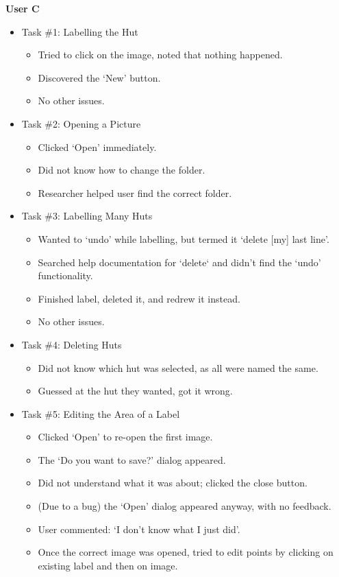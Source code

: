 \documentclass[11pt,twocolumn]{article}
\begin{document}
\textbf{User C}
\begin{itemize}
\item Task \#1: Labelling the Hut
\begin{itemize}
\item Tried to click on the image, noted that nothing happened.
\item Discovered the `New' button.
\item No other issues.
\end{itemize}
\item Task \#2: Opening a Picture
\begin{itemize}
\item Clicked `Open' immediately. 
\item Did not know how to change the folder.
\item Researcher helped user find the correct folder.
\end{itemize}
\item Task \#3: Labelling Many Huts
\begin{itemize}
\item Wanted to `undo' while labelling, but termed it `delete [my] last line'.
\item Searched help documentation for `delete` and didn't find the `undo' functionality.
\item Finished label, deleted it, and redrew it instead.
\item No other issues.
\end{itemize}
\item Task \#4: Deleting Huts
\begin{itemize}
\item Did not know which hut was selected, as all were named the same.
\item Guessed at the hut they wanted, got it wrong.
\end{itemize}
\item Task \#5: Editing the Area of a Label
\begin{itemize}
\item Clicked `Open' to re-open the first image.
\item The `Do you want to save?' dialog appeared.
\item Did not understand what it was about; clicked the close button.
\item (Due to a bug) the `Open' dialog appeared anyway, with no feedback.
\item User commented: `I don't know what I just did'.
\item Once the correct image was opened, tried to edit points by clicking on existing label and then on image.

\end{itemize}
\end{itemize}
\end{document}
